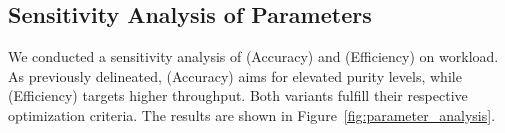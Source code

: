 


\subsection{Sensitivity Analysis of Parameters}
We conducted a sensitivity analysis of \algo (Accuracy) and \algo (Efficiency) on \fct workload. As previously delineated, \algo (Accuracy) aims for elevated purity levels, while \algo (Efficiency) targets higher throughput. Both variants fulfill their respective optimization criteria. The results are shown in Figure~\ref{fig:parameter_analysis}.

